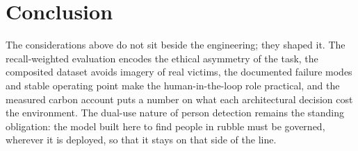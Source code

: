 \section{Conclusion}
The considerations above do not sit beside the engineering; they shaped it.
The recall-weighted evaluation encodes the ethical asymmetry of the task, the
composited dataset avoids imagery of real victims, the documented failure
modes and stable operating point make the human-in-the-loop role practical,
and the measured carbon account puts a number on what each architectural
decision cost the environment. The dual-use nature of person detection
remains the standing obligation: the model built here to find people in
rubble must be governed, wherever it is deployed, so that it stays on that
side of the line.
